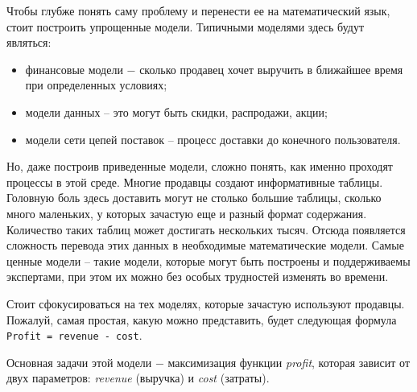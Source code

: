 Чтобы глубже понять саму проблему и перенести ее на математический язык, стоит построить упрощенные модели. Типичными моделями здесь будут являться:
\begin{itemize}
  \item финансовые модели ​− сколько продавец хочет выручить в ближайшее время при определенных условиях;
  \item модели данных – это могут быть скидки, распродажи, акции;
  \item модели сети цепей поставок – процесс доставки до конечного пользователя.
\end{itemize}

Но, даже построив приведенные модели, сложно понять, как именно проходят процессы в этой среде. Многие продавцы создают информативные таблицы. Головную боль здесь доставить могут не столько большие таблицы, сколько много маленьких, у которых зачастую еще и разный формат содержания. Количество таких таблиц может достигать нескольких тысяч. Отсюда появляется сложность перевода этих данных в необходимые математические модели. Самые ценные модели – такие модели, которые могут быть построены и поддерживаемы экспертами, при этом их можно без особых трудностей изменять во времени.

Стоит сфокусироваться на тех моделях, которые зачастую используют продавцы. Пожалуй, самая простая, какую можно представить, будет следующая формула \lstinline{Profit = revenue - cost}.

Основная задачи этой модели ​− максимизация функции \emph{profit}, которая зависит от двух параметров: \emph{revenue} (выручка) и \emph{cost} (затраты).
